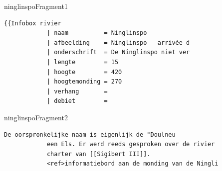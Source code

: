 \documentclass[presentatie.tex]{subfiles}
\begin{document}
    \begin{saveblock}{ninglinspoFragment1}
        \begin{Verbatim}[tabsize=4,gobble=8]
            {{Infobox rivier
            | naam          = Ninglinspo
            | afbeelding    = Ninglinspo - arrivée d
            | onderschrift  = De Ninglinspo niet ver
            | lengte        = 15
            | hoogte        = 420
            | hoogtemonding = 270
            | verhang       =
            | debiet        =
        \end{Verbatim}
    \end{saveblock}

    \begin{saveblock}{ninglinspoFragment2}
        \begin{Verbatim}[tabsize=4,gobble=8]
            De oorspronkelijke naam is eigenlijk de "Doulneu
            een Els. Er werd reeds gesproken over de rivier
            charter van [[Sigibert III]].
            <ref>informatiebord aan de monding van de Ningli
        \end{Verbatim}
    \end{saveblock}
\end{document}
